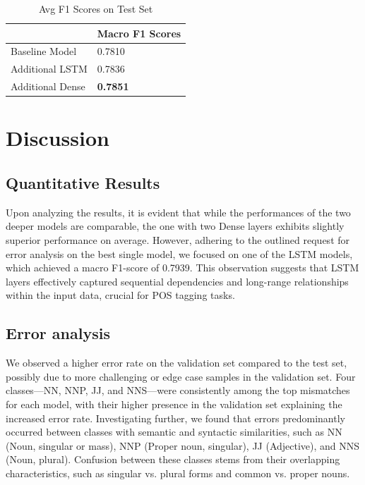 \documentclass[11pt]{article}
\begin{document}
\begin{table}[ht]
\footnotesize
\caption{Avg F1 Scores on Test Set}
\centering
\begin{tabular}{|l|l|}
\hline
                             & Macro F1 Scores \\ \hline
Baseline Model                     & 0.7810                   \\ \hline
Additional LSTM                    & 0.7836                  \\ \hline
Additional Dense                  &  \textbf{0.7851}                   \\ \hline
\end{tabular}
\label{Tab:Tcr_2}
\end{table}


\section{Discussion}
\label{sec:discussion}
\subsection{Quantitative Results}
Upon analyzing the results, it is evident that while the performances of the two deeper models are comparable, the one with two Dense layers exhibits slightly superior performance on average. However, adhering to the outlined request for error analysis on the best single model, we focused on one of the LSTM models, which achieved a macro F1-score of 0.7939. This observation suggests that LSTM layers effectively captured sequential dependencies and long-range relationships within the input data, crucial for POS tagging tasks.

\subsection{Error analysis}
We observed a higher error rate on the validation set compared to the test set, possibly due to more challenging or edge case samples in the validation set. Four classes—NN, NNP, JJ, and NNS—were consistently among the top mismatches for each model, with their higher presence in the validation set explaining the increased error rate.
Investigating further, we found that errors predominantly occurred between classes with semantic and syntactic similarities, such as NN (Noun, singular or mass), NNP (Proper noun, singular), JJ (Adjective), and NNS (Noun, plural). Confusion between these classes stems from their overlapping characteristics, such as singular vs. plural forms and common vs. proper nouns.
\end{document}
